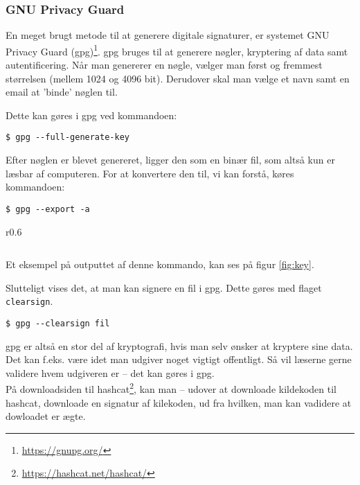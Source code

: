    \subsubsection{GNU Privacy Guard}
    En meget brugt metode til at generere digitale signaturer, er systemet GNU Privacy Guard (gpg)\footnote{\url{https://gnupg.org/}}.
    gpg bruges til at generere nøgler, kryptering af data samt autentificering.
    Når man genererer en nøgle, vælger man først og fremmest størrelsen (mellem 1024 og 4096 bit).
    Derudover skal man vælge et navn samt en email at 'binde' nøglen til.
    \par
    Dette kan gøres i gpg ved kommandoen:
    \begin{verbatim}
$ gpg --full-generate-key
    \end{verbatim}


    Efter nøglen er blevet genereret, ligger den som en binær fil, som altså kun er læsbar af computeren.
    For at konvertere den til, vi kan forstå, køres kommandoen:


    \begin{verbatim}
$ gpg --export -a
    \end{verbatim}

    \begin{wrapfigure}{r}{0.6\textwidth}
        \vspace{-30pt}
        \begin{center}
            \inputminted[python3, breaklines, fontsize=\scriptsize]{bash}{src/public.key}
            \vspace{-20pt}
            \caption{1024-bit nøgle genereret i gpg}
            \label{fig:key}
        \end{center}
        \vspace{-50pt}
    \end{wrapfigure}

    Et eksempel på outputtet af denne kommando, kan ses på figur \ref{fig:key}.
    \par
    Slutteligt vises det, at man kan signere en fil i gpg.
    Dette gøres med flaget \texttt{clearsign}.
    \begin{verbatim}
$ gpg --clearsign fil
    \end{verbatim}

    gpg er altså en stor del af kryptografi, hvis man selv ønsker at kryptere sine data.
    Det kan f.eks. være idet man udgiver noget vigtigt offentligt.
    Så vil læserne gerne validere hvem udgiveren er -- det kan gøres i gpg.\\
    På downloadsiden til hashcat\footnote{\url{https://hashcat.net/hashcat/}}, kan man -- udover at downloade kildekoden til hashcat, downloade en signatur af kilekoden, ud fra hvilken, man kan vadidere at dowloadet er ægte.


